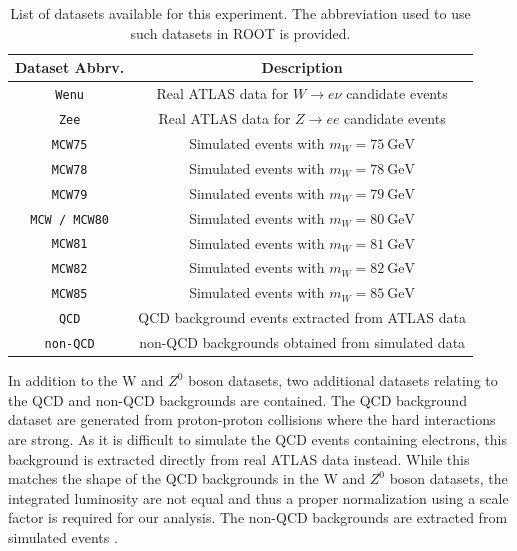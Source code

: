 \documentclass[a4paper]{report}
\numberwithin{equation}{section}
\begin{document}
\begin{table}
    \centering
    \begin{tabular}{|c|c|}  \hline
     Dataset Abbrv.& Description    \\ \hline
     \texttt{Wenu} &  Real ATLAS data for  $W \rightarrow e\nu$ candidate events \\
     \texttt{Zee} &  Real ATLAS data for  $Z \rightarrow ee$ candidate events  \\ 
     \texttt{MCW75} &  Simulated events with $m_W = \SI{75}{\giga\electronvolt}$ \\ 
     \texttt{MCW78} &  Simulated events with $m_W = \SI{78}{\giga\electronvolt}$ \\ 
     \texttt{MCW79} &  Simulated events with $m_W = \SI{79}{\giga\electronvolt}$ \\ 
     \texttt{MCW / MCW80} &  Simulated events with $m_W = \SI{80}{\giga\electronvolt}$ \\ 
     \texttt{MCW81} &  Simulated events with $m_W = \SI{81}{\giga\electronvolt}$ \\ 
     \texttt{MCW82} &  Simulated events with $m_W = \SI{82}{\giga\electronvolt}$ \\ 
     \texttt{MCW85} &  Simulated events with $m_W = \SI{85}{\giga\electronvolt}$ \\ 
     \texttt{QCD} & QCD background events extracted from ATLAS data \\ 
     \texttt{non-QCD} & non-QCD backgrounds obtained from simulated data \\ \hline
    \end{tabular}
    \caption{List of datasets available for this experiment. The abbreviation used to use such datasets in ROOT is 
    provided.}
    \label{tab:datasets}
\end{table}

In addition to the W and $Z^0$ boson datasets, two additional datasets relating to the QCD and non-QCD backgrounds are contained. The QCD
background dataset are generated from proton-proton collisions where the hard interactions are strong. As it is difficult to 
simulate the QCD events containing electrons, this background is extracted directly from real ATLAS data instead. While this matches the 
shape of the QCD backgrounds in the W and $Z^0$ boson datasets, the integrated luminosity are not equal and thus a proper normalization
using a scale factor is required for our analysis. The non-QCD backgrounds are extracted from simulated events \cite{labman}. \par 
\end{document}
